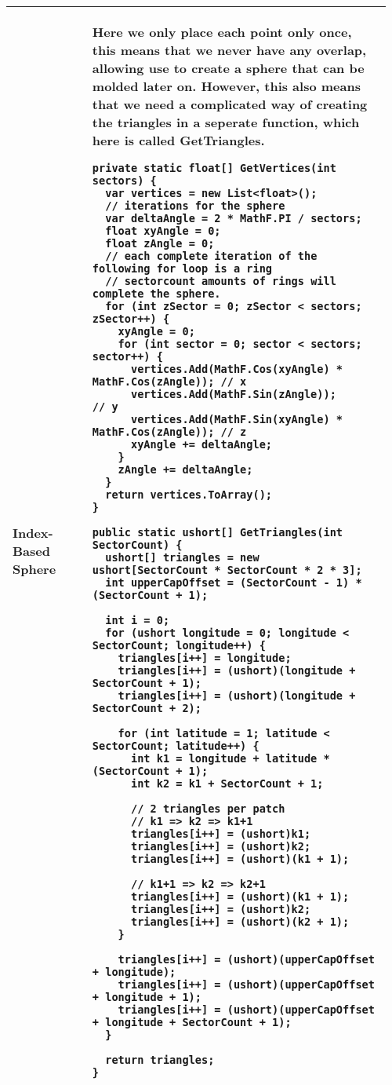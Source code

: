 \documentclass[main.tex,fontsize=8pt,paper=a4,paper=portrait,DIV=calc,]{scrartcl}
\begin{document}
\begin{table}[ht!]
\begin{tabular}{|m{0.2\linewidth}|m{0.755\linewidth}|}
\hline
Index-Based Sphere & 
Here we only place each point only once, this means that we never have any overlap, allowing use to create a sphere that can be molded later on.\newline 
However, this also means that we need a complicated way of creating the triangles in a seperate function, which here is called \textbf{GetTriangles}.\newline
\begin{lstlisting}
private static float[] GetVertices(int sectors) {
  var vertices = new List<float>();
  // iterations for the sphere
  var deltaAngle = 2 * MathF.PI / sectors;
  float xyAngle = 0;
  float zAngle = 0;
  // each complete iteration of the following for loop is a ring
  // sectorcount amounts of rings will complete the sphere.
  for (int zSector = 0; zSector < sectors; zSector++) {
    xyAngle = 0;
    for (int sector = 0; sector < sectors; sector++) {
      vertices.Add(MathF.Cos(xyAngle) * MathF.Cos(zAngle)); // x
      vertices.Add(MathF.Sin(zAngle));                      // y
      vertices.Add(MathF.Sin(xyAngle) * MathF.Cos(zAngle)); // z
      xyAngle += deltaAngle;
    }
    zAngle += deltaAngle;
  }
  return vertices.ToArray();
}

public static ushort[] GetTriangles(int SectorCount) {
  ushort[] triangles = new ushort[SectorCount * SectorCount * 2 * 3];
  int upperCapOffset = (SectorCount - 1) * (SectorCount + 1);

  int i = 0;
  for (ushort longitude = 0; longitude < SectorCount; longitude++) {
    triangles[i++] = longitude;
    triangles[i++] = (ushort)(longitude + SectorCount + 1);
    triangles[i++] = (ushort)(longitude + SectorCount + 2);

    for (int latitude = 1; latitude < SectorCount; latitude++) {
      int k1 = longitude + latitude * (SectorCount + 1);
      int k2 = k1 + SectorCount + 1;

      // 2 triangles per patch
      // k1 => k2 => k1+1
      triangles[i++] = (ushort)k1;
      triangles[i++] = (ushort)k2;
      triangles[i++] = (ushort)(k1 + 1);

      // k1+1 => k2 => k2+1
      triangles[i++] = (ushort)(k1 + 1);
      triangles[i++] = (ushort)k2;
      triangles[i++] = (ushort)(k2 + 1);
    }

    triangles[i++] = (ushort)(upperCapOffset + longitude);
    triangles[i++] = (ushort)(upperCapOffset + longitude + 1);
    triangles[i++] = (ushort)(upperCapOffset + longitude + SectorCount + 1);
  }

  return triangles;
}
\end{lstlisting}
\\
\hline
\end{tabular}
\end{table}
\end{document}
